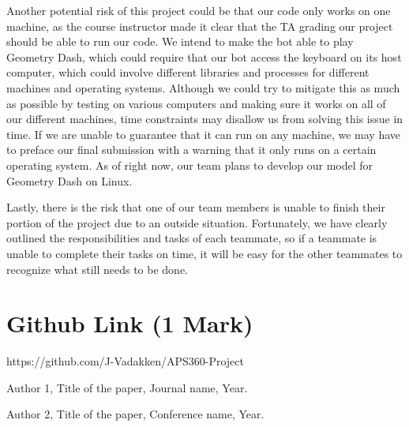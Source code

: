 \documentclass{article}
\begin{document}
Another potential risk of this project could be that our code only works
on one machine, as the course instructor made it clear that the TA grading
our project should be able to run our code. We intend to make the bot 
able to play Geometry Dash, which could require that our bot access the 
keyboard on its host computer, which could involve different libraries 
and processes for different machines and operating systems. Although 
we could try to mitigate this as much as possible by testing on various 
computers and making sure it works on all of our different machines, time
constraints may disallow us from solving this issue in time. If we are 
unable to guarantee that it can run on any machine, we may have to preface 
our final submission with a warning that it only runs on a certain 
operating system. As of right now, our team plans to develop our model 
for Geometry Dash on Linux. 

Lastly, there is the risk that one of our team members is unable to finish
their portion of the project due to an outside situation. Fortunately, 
we have clearly outlined the responsibilities and tasks of each teammate, 
so if a teammate is unable to complete their tasks on time, it will be 
easy for the other teammates to recognize what still needs to be done.


\section{Github Link (1 Mark)}
https://github.com/J-Vadakken/APS360-Project

\begin{thebibliography}{9}
Author 1, Title of the paper, Journal name, Year.

Author 2, Title of the paper, Conference name, Year.
\end{thebibliography}
\end{document}
